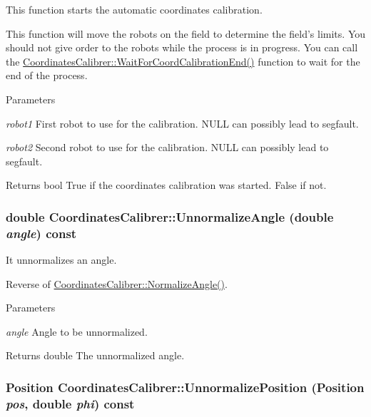 This function starts the automatic coordinates calibration. 

This function will move the robots on the field to determine the field's limits. You should not give order to the robots while the process is in progress. You can call the \hyperlink{classCoordinatesCalibrer_a99563ba6e43f839bf1b10f55cf155125}{CoordinatesCalibrer::WaitForCoordCalibrationEnd()} function to wait for the end of the process.


\begin{DoxyParams}{Parameters}
\item[{\em robot1}]First robot to use for the calibration. NULL can possibly lead to segfault. \item[{\em robot2}]Second robot to use for the calibration. NULL can possibly lead to segfault. \end{DoxyParams}
\begin{DoxyReturn}{Returns}
bool True if the coordinates calibration was started. False if not. 
\end{DoxyReturn}
\hypertarget{classCoordinatesCalibrer_ab97fd4d3f3930aaff39cee1543022cb6}{
\subsubsection[{UnnormalizeAngle}]{\setlength{\rightskip}{0pt plus 5cm}double CoordinatesCalibrer::UnnormalizeAngle (double {\em angle}) const}}
\label{classCoordinatesCalibrer_ab97fd4d3f3930aaff39cee1543022cb6}


It unnormalizes an angle. 

Reverse of \hyperlink{classCoordinatesCalibrer_acae6b5f07cf198f9c85a1b09e9a275dc}{CoordinatesCalibrer::NormalizeAngle()}.


\begin{DoxyParams}{Parameters}
\item[{\em angle}]Angle to be unnormalized. \end{DoxyParams}
\begin{DoxyReturn}{Returns}
double The unnormalized angle. 
\end{DoxyReturn}
\hypertarget{classCoordinatesCalibrer_a19035a69d4d571e5e1d4baa4ba10baee}{
\subsubsection[{UnnormalizePosition}]{\setlength{\rightskip}{0pt plus 5cm}Position CoordinatesCalibrer::UnnormalizePosition (Position {\em pos}, \/  double {\em phi}) const}}
\label{classCoordinatesCalibrer_a19035a69d4d571e5e1d4baa4ba10baee}


